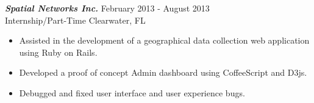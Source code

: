 {\sl \textbf{Spatial Networks Inc.}} \hfill February 2013 - August 2013 \\
Internship/Part-Time \hfill Clearwater, FL
\begin{itemize}
    \item Assisted in the development of a geographical data collection web application using Ruby on Rails.
    \item Developed a proof of concept Admin dashboard using CoffeeScript and D3js.
    \item Debugged and fixed user interface and user experience bugs.
\end{itemize}
